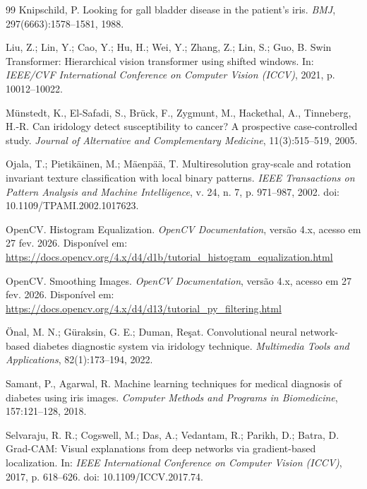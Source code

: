 \documentclass[11pt,a4paper]{article}
\begin{document}
\begin{thebibliography}{99}
Knipschild, P.
\newblock Looking for gall bladder disease in the patient's iris.
\newblock \emph{BMJ}, 297(6663):1578--1581, 1988.

Liu, Z.; Lin, Y.; Cao, Y.; Hu, H.; Wei, Y.; Zhang, Z.; Lin, S.; Guo, B.
\newblock Swin Transformer: Hierarchical vision transformer using shifted windows.
\newblock In: \emph{IEEE/CVF International Conference on Computer Vision (ICCV)}, 2021, p. 10012--10022.

M{\"u}nstedt, K., El-Safadi, S., Br{\"u}ck, F., Zygmunt, M., Hackethal, A., Tinneberg, H.-R.
\newblock Can iridology detect susceptibility to cancer? A prospective case-controlled study.
\newblock \emph{Journal of Alternative and Complementary Medicine}, 11(3):515--519, 2005.

Ojala, T.; Pietik\"ainen, M.; M\"aenp\"a\"a, T.
\newblock Multiresolution gray-scale and rotation invariant texture classification with local binary patterns.
\newblock \emph{IEEE Transactions on Pattern Analysis and Machine Intelligence}, v. 24, n. 7, p. 971--987, 2002.
\newblock doi: 10.1109/TPAMI.2002.1017623.

OpenCV.
\newblock Histogram Equalization.
\newblock \emph{OpenCV Documentation}, versão 4.x, acesso em 27 fev. 2026.
\newblock Disponível em: \url{https://docs.opencv.org/4.x/d4/d1b/tutorial_histogram_equalization.html}

OpenCV.
\newblock Smoothing Images.
\newblock \emph{OpenCV Documentation}, versão 4.x, acesso em 27 fev. 2026.
\newblock Disponível em: \url{https://docs.opencv.org/4.x/d4/d13/tutorial_py_filtering.html}

{\"O}nal, M. N.; G{\"u}raksin, G. E.; Duman, Re\c{s}at.
\newblock Convolutional neural network-based diabetes diagnostic system via iridology technique.
\newblock \emph{Multimedia Tools and Applications}, 82(1):173--194, 2022.

Samant, P., Agarwal, R.
\newblock Machine learning techniques for medical diagnosis of diabetes using iris images.
\newblock \emph{Computer Methods and Programs in Biomedicine}, 157:121--128, 2018.

Selvaraju, R. R.; Cogswell, M.; Das, A.; Vedantam, R.; Parikh, D.; Batra, D.
\newblock Grad-CAM: Visual explanations from deep networks via gradient-based localization.
\newblock In: \emph{IEEE International Conference on Computer Vision (ICCV)}, 2017, p. 618--626.
\newblock doi: 10.1109/ICCV.2017.74.


\end{thebibliography}
\end{document}
